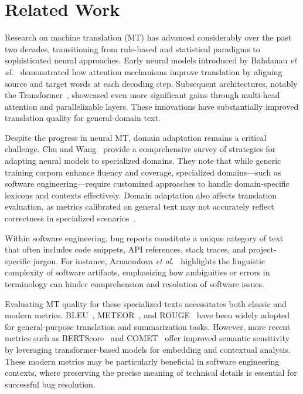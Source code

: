 \section{Related Work}
\label{sec:related_work}
Research on machine translation (MT) has advanced considerably over the past two decades, transitioning from rule-based and statistical paradigms to sophisticated neural approaches. Early neural models introduced by Bahdanau \emph{et al.}~\cite{bahdanau2014neural} demonstrated how attention mechanisms improve translation by aligning source and target words at each decoding step. Subsequent architectures, notably the Transformer~\cite{Vaswani2017}, showcased even more significant gains through multi-head attention and parallelizable layers. These innovations have substantially improved translation quality for general-domain text.

Despite the progress in neural MT, domain adaptation remains a critical challenge. Chu and Wang~\cite{Chu2018} provide a comprehensive survey of strategies for adapting neural models to specialized domains. They note that while generic training corpora enhance fluency and coverage, specialized domains—such as software engineering—require customized approaches to handle domain-specific lexicons and contexts effectively. Domain adaptation also affects translation evaluation, as metrics calibrated on general text may not accurately reflect correctness in specialized scenarios~\cite{Koehn2010}.

Within software engineering, bug reports constitute a unique category of text that often includes code snippets, API references, stack traces, and project-specific jargon. For instance, Arnaoudova \emph{et al.}~\cite{arnaoudova2016linguistic} highlights the linguistic complexity of software artifacts, emphasizing how ambiguities or errors in terminology can hinder comprehension and resolution of software issues.

Evaluating MT quality for these specialized texts necessitates both classic and modern metrics. BLEU~\cite{papineni2002bleu}, METEOR~\cite{banerjee2005meteor}, and ROUGE~\cite{Lin2004} have been widely adopted for general-purpose translation and summarization tasks. However, more recent metrics such as BERTScore~\cite{zhang2019bertscore} and COMET~\cite{rei2020comet} offer improved semantic sensitivity by leveraging transformer-based models for embedding and contextual analysis. These modern metrics may be particularly beneficial in software engineering contexts, where preserving the precise meaning of technical details is essential for successful bug resolution.

